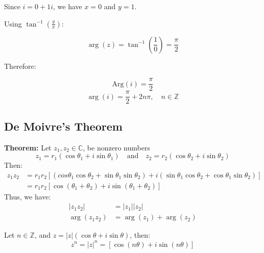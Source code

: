 \documentclass[a4paper,12pt]{article} %
\theoremstyle{definition}
\theoremstyle{plain}
\begin{document}
\begin{examplebox}
  Since $i = 0 + 1i$, we have $x = 0$ and $y = 1$.

  Using $\tan^{-1}\left(\frac{y}{x}\right)$:

  \[
    \arg(z) = \tan^{-1}\left(\frac{1}{0}\right) = \frac{\pi}{2}
  \]

  Therefore:

  \[
    \text{Arg}(i) = \frac{\pi}{2}
  \]
  \[
    \arg(i) = \frac{\pi}{2} + 2n\pi, \quad n \in \mathbb{Z}
  \]
\end{examplebox}

\pagebreak

\subsection{De Moivre's Theorem}
\textbf{Theorem:} Let $z_1,z_2 \in \mathbb{C}$, be nonzero numbers
$$z_1 = r_1(\cos\theta_1 + i\sin\theta_1) \quad \text{and} \quad z_2 = r_2(\cos\theta_2 + i\sin\theta_2)$$
Then:
\begin{align*}
  z_1z_2 & = r_1r_2[(cos\theta_1\cos\theta_2  + \sin\theta_1\sin\theta_2) + i(\sin\theta_1\cos\theta_2 + \cos\theta_1\sin\theta_2)] \\
         & = r_1r_2[\cos(\theta_1 + \theta_2) + i\sin(\theta_1 + \theta_2)]
\end{align*}
Thus, we have:
\begin{align*}
  |z_1z_2|     & = |z_1||z_2|            \\
  \arg(z_1z_2) & = \arg(z_1) + \arg(z_2)
\end{align*}

\begin{theorembox}
  Let $n \in \mathbb{Z}$, and $z = |z|(\cos\theta + i\sin\theta)$, then:
  $$z^n = |z|^n = [\cos(n\theta) + i\sin(n\theta)]$$
\end{theorembox}
\end{document}
